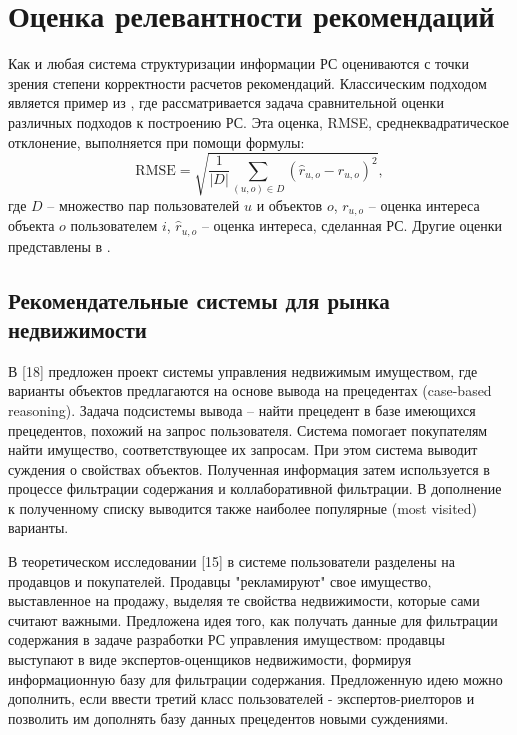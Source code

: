 \documentclass[a4paper,14pt,openany,final]{extreport} %
\begin{document}
\section{Оценка релевантности рекомендаций}
\label{sec:rs-eval}

Как и любая система структуризации информации РС оцениваются с точки зрения степени корректности расчетов рекомендаций. Классическим подходом является пример из \cite{b13}, где рассматривается задача сравнительной оценки различных подходов к построению РС.  Эта оценка, RMSE, среднеквадратическое отклонение, выполняется при помощи формулы:
    \[
      \mbox{RMSE}=\sqrt{\frac{1}{|D|}\sum_{(u,o)\in D}(\hat{r}_{u,o}-r_{u,o})^2},
    \]
где $D$ -- множество пар пользователей $u$ и объектов $o$, $r_{u,o}$ -- оценка интереса объекта $o$ пользователем $i$, \(\hat{r}_{u,o}\) -- оценка интереса, сделанная РС. Другие оценки представлены в \cite{b10}. %




\subsection{Рекомендательные системы для рынка недвижимости}
\label{sec:ex-retail}


В [18] предложен проект системы управления недвижимым имуществом, где варианты объектов предлагаются на основе вывода на прецедентах (case-based reasoning). Задача подсистемы вывода – найти  прецедент в базе имеющихся прецедентов, похожий на запрос пользователя. Система помогает покупателям найти имущество, соответствующее их запросам. При этом система выводит суждения о свойствах объектов. Полученная информация затем используется в процессе фильтрации содержания и коллаборативной фильтрации. В дополнение к полученному списку выводится также наиболее популярные (most visited) варианты.

В теоретическом исследовании [15] в системе пользователи разделены на продавцов и покупателей. Продавцы "рекламируют" свое имущество, выставленное на продажу, выделяя те свойства недвижимости, которые сами считают важными. Предложена идея того, как получать данные для фильтрации содержания в задаче разработки РС управления имуществом: продавцы выступают в виде экспертов-оценщиков недвижимости, формируя информационную базу для фильтрации содержания. Предложенную идею можно дополнить, если ввести третий класс пользователей - экспертов-риелторов и позволить им дополнять базу данных прецедентов новыми суждениями.
\end{document}
